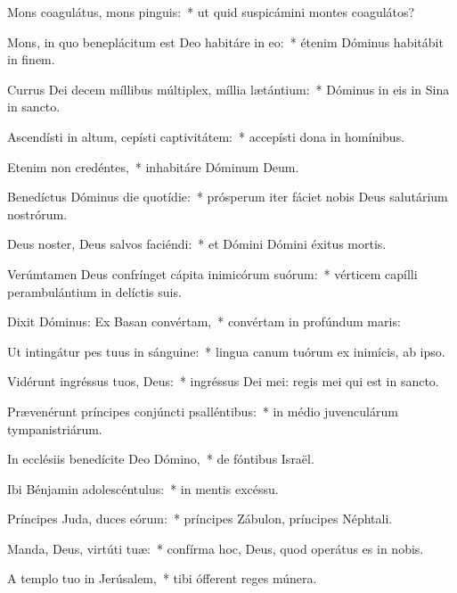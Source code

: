 \item Mons coagulátus, mons pinguis:~* ut quid suspicámini montes coagulátos?

\item Mons, in quo beneplácitum est Deo habitáre in eo:~* étenim Dóminus habitábit in finem.

\item Currus Dei decem míllibus múltiplex, míllia lætántium:~* Dóminus in eis in Sina in sancto.

\item Ascendísti in altum, cepísti captivitátem:~* accepísti dona in homínibus.

\item Etenim non credéntes,~* inhabitáre Dóminum Deum.

\item Benedíctus Dóminus die quotídie:~* prósperum iter fáciet nobis Deus salutárium nostrórum.

\item Deus noster, Deus salvos faciéndi:~* et Dómini Dómini éxitus mortis.

\item Verúmtamen Deus confrínget cápita inimicórum suórum:~* vérticem capílli perambulántium in delíctis suis.

\item Dixit Dóminus: Ex Basan convértam,~* convértam in profúndum maris:

\item Ut intingátur pes tuus in sánguine:~* lingua canum tuórum ex inimícis, ab ipso.

\item Vidérunt ingréssus tuos, Deus:~* ingréssus Dei mei: regis mei qui est in sancto.

\item Prævenérunt príncipes conjúncti psalléntibus:~* in médio juvenculárum tympanistriárum.

\item In ecclésiis benedícite Deo Dómino,~* de fóntibus Israël.

\item Ibi Bénjamin adolescéntulus:~* in mentis excéssu.

\item Príncipes Juda, duces eórum:~* príncipes Zábulon, príncipes Néphtali.

\item Manda, Deus, virtúti tuæ:~* confírma hoc, Deus, quod operátus es in nobis.

\item A templo tuo in Jerúsalem,~* tibi ófferent reges múnera.

